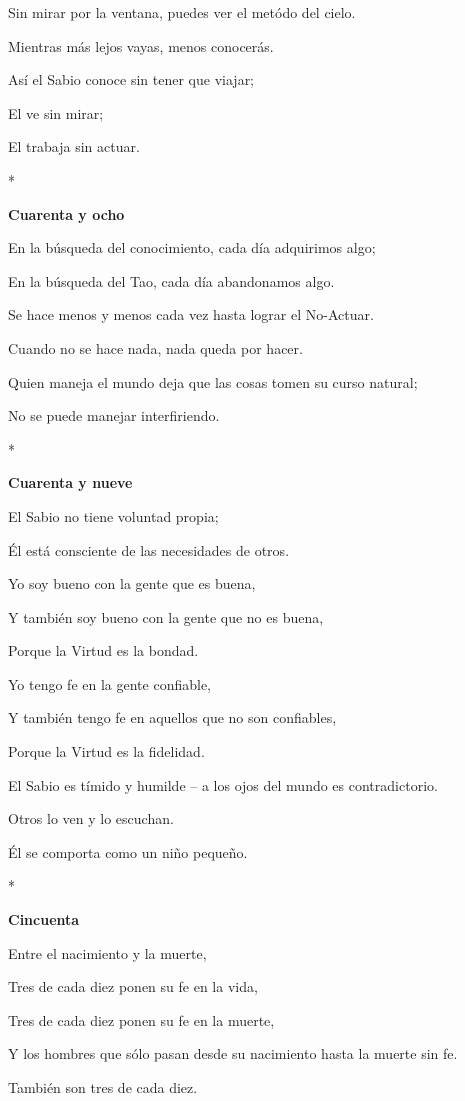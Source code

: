 Sin mirar por la ventana, puedes ver el metódo del cielo.

Mientras más lejos vayas, menos conocerás.

Así el Sabio conoce sin tener que viajar;

El ve sin mirar;

El trabaja sin actuar.

*

\textbf{Cuarenta y ocho}

En la búsqueda del conocimiento, cada día adquirimos algo;

En la búsqueda del Tao, cada día abandonamos algo.

Se hace menos y menos cada vez hasta lograr el No-Actuar.

Cuando no se hace nada, nada queda por hacer.

Quien maneja el mundo deja que las cosas tomen su curso natural;

No se puede manejar interfiriendo.

*

\textbf{Cuarenta y nueve}

El Sabio no tiene voluntad propia;

Él está consciente de las necesidades de otros.

Yo soy bueno con la gente que es buena,

Y también soy bueno con la gente que no es buena,

Porque la Virtud es la bondad.

Yo tengo fe en la gente confiable,

Y también tengo fe en aquellos que no son confiables,

Porque la Virtud es la fidelidad.

El Sabio es tímido y humilde -- a los ojos del mundo es contradictorio.

Otros lo ven y lo escuchan.

Él se comporta como un niño pequeño.

*

\textbf{Cincuenta}

Entre el nacimiento y la muerte,

Tres de cada diez ponen su fe en la vida,

Tres de cada diez ponen su fe en la muerte,

Y los hombres que sólo pasan desde su nacimiento hasta la muerte sin fe.

También son tres de cada diez.

